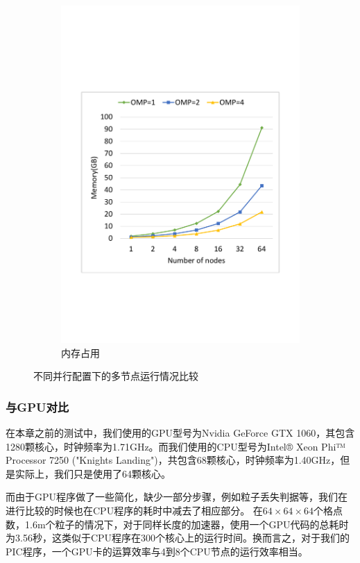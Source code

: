 \begin{figure}[!htb]
\begin{subfigure}[b]{0.48\textwidth}
        \includegraphics[width=\textwidth]{Img/PIC_speedup_Cori_multi_nodes_memory.pdf}
        \caption{内存占用}
    \end{subfigure}
    \caption{不同并行配置下的多节点运行情况比较}
    \label{fig:PIC_speedup_Cori_multi_nodes_timeMemory}
\end{figure}

\subsubsection{与GPU对比}

在本章之前的测试中，我们使用的GPU型号为Nvidia GeForce GTX 1060，其包含1280颗核心，时钟频率为1.71GHz。而我们使用的CPU型号为Intel® Xeon Phi™ Processor 7250 ("Knights Landing")，共包含68颗核心，时钟频率为1.40GHz，但是实际上，我们只是使用了64颗核心。

而由于GPU程序做了一些简化，缺少一部分步骤，例如粒子丢失判据等，我们在进行比较的时候也在CPU程序的耗时中减去了相应部分。
在$64 \times 64 \times 64$个格点数，1.6m个粒子的情况下，对于同样长度的加速器，使用一个GPU代码的总耗时为3.56秒，这类似于CPU程序在300个核心上的运行时间。换而言之，对于我们的PIC程序，一个GPU卡的运算效率与4到8个CPU节点的运行效率相当。



